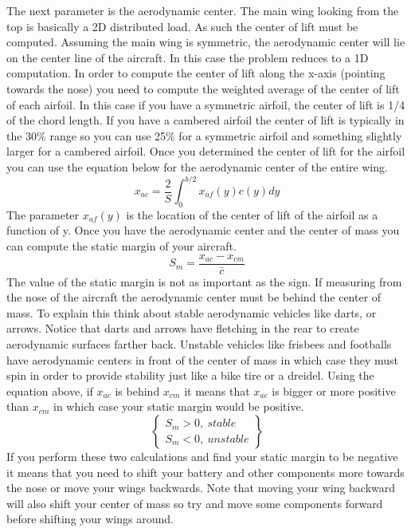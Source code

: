 \documentclass{article}
\begin{document}
The next parameter is the aerodynamic center. The main wing looking
from the top is basically a 2D distributed load. As such the center of
lift must be computed. Assuming the main wing is symmetric, the
aerodynamic center will lie on the center line of the aircraft. In
this case the problem reduces to a 1D computation. In order to compute
the center of lift along the x-axis (pointing towards the nose) you
need to compute the weighted average of the center of lift of each
airfoil. In this case if you have a symmetric airfoil, the center of
lift is 1/4 of the chord length. If you have a cambered airfoil the
center of lift is typically in the 30\% range so you can use 25\% for
a symmetric airfoil and something slightly larger for a cambered
airfoil. Once you determined the center of lift for the airfoil you
can use the equation below for the aerodynamic center of the entire
wing\cite{AndersonD,caughey}.
\begin{equation}
x_{ac} = \frac{2}{S}\int^{b/2}_0 x_{af}(y)c(y) dy
\end{equation}
The parameter $x_{af}(y)$ is the location of the center of lift of the
airfoil as a function of y. Once you have the aerodynamic center and the
center of mass you can compute the static margin of your aircraft.
\begin{equation}
S_{m} = \frac{x_{ac}-x_{cm}}{\bar{c}}
\end{equation}
The value of the static margin is not as important as the sign. If
measuring from the nose of the aircraft the aerodynamic center must be
behind the center of mass. To explain this think about stable
aerodynamic vehicles like darts, or arrows. Notice that darts and
arrows have fletching in the rear to create aerodynamic surfaces
farther back. Unstable vehicles like frisbees and footballs have
aerodynamic centers in front of the center of mass in which case they
must spin in order to provide stability just like a bike tire or a
dreidel. Using the equation above, if $x_{ac}$ is behind $x_{cm}$ it
means that $x_{ac}$ is bigger or more positive than $x_{cm}$ in which
case your static margin would be positive.
\begin{equation}
\begin{Bmatrix} S_m>0,~stable \\ S_m<0,~unstable \end{Bmatrix}
\end{equation}
If you perform these two calculations and find your static margin to
be negative it means that you need to shift your battery and other
components more towards the nose or move your wings backwards. Note
that moving your wing backward will also shift your center of mass so
try and move some components forward before shifting your wings
around.
\end{document}
